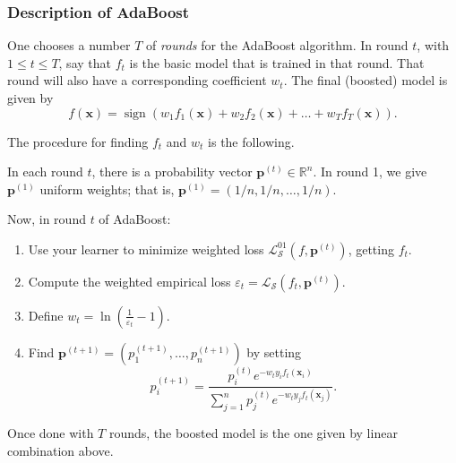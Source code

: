 \documentclass[smaller]{beamer}
\theoremstyle{example}
\newcommand{\x}{\textbf{x}}
\begin{document}
\begin{frame}
    \frametitle{Description of AdaBoost}
    One chooses a number $T$ of \textit{rounds} for the AdaBoost algorithm. In round $t$, with $1\le t\le T$, say that $f_t$ is the basic model that is trained in that round. That round will also have a corresponding coefficient $w_t$. The final (boosted) model is given by 
            \[f(\x) = \operatorname{sign}(w_1f_1(\x) + w_2f_2(\x) + \ldots + w_Tf_T(\x)).\]
    
    \pause
    The procedure for finding $f_t$ and $w_t$ is the following. 

    In each round $t$, there is a probability vector $\textbf{p}^{(t)}\in\mathbb R^n$. In round 1, we give $\textbf{p}^{(1)}$ uniform weights; that is, $\textbf{p}^{(1)} = (1/n, 1/n, \ldots, 1/n)$. 

    \pause
    Now, in round $t$ of AdaBoost:
    \begin{enumerate}
        \item Use your learner to minimize weighted loss $\mathcal L_{\mathcal S}^{01}(f,\textbf{p}^{(t)})$, getting $f_t$.
        \pause
        \item Compute the weighted empirical loss $\varepsilon_t = \mathcal L_{\mathcal S}(f_t, \textbf{p}^{(t)})$. 
        \pause
        \item Define $w_t = \ln\left(\frac{1}{\varepsilon_t} - 1\right)$.
        \pause
        \item Find $\textbf{p}^{(t+1)} = (p_1^{(t+1)}, \ldots, p_n^{(t+1)})$ by setting 
            \[p_i^{(t+1)} = \frac{p_i^{(t)}e^{-w_ty_if_t(\x_i)}}{\sum_{j=1}^n p_j^{(t)}e^{-w_ty_jf_t(\x_j)}}.\]
    \end{enumerate}

    \pause
    Once done with $T$ rounds, the boosted model is the one given by linear combination above.

\end{frame}
\end{document}
